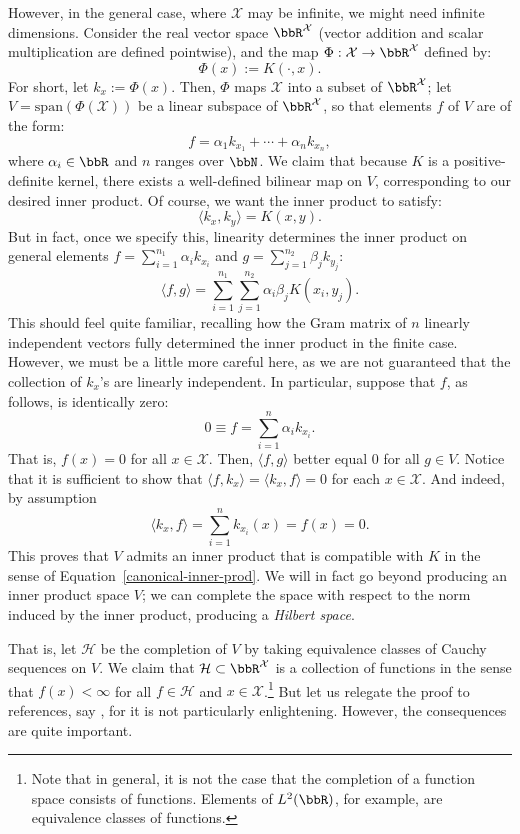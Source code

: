 \documentclass[twoside,11pt]{homework}
\begin{document}
However, in the general case, where $\mathcal{X}$ may be infinite, we might need infinite dimensions. Consider the real vector space $\bbR^\mathcal{X}$ (vector addition and scalar multiplication are defined pointwise), and the map $\Phi: \mathcal{X} \to \bbR^\mathcal{X}$ defined by:
\[\Phi(x) :=K(\cdot, x).\]
For short, let $k_x := \Phi(x)$. Then, $\Phi$ maps $\mathcal{X}$ into a subset of $\bbR^\mathcal{X}$; let $V = \mathrm{span}(\Phi(\mathcal{X}))$ be a linear subspace of $\bbR^\mathcal{X}$, so that elements $f$ of $V$ are of the form:
\[f= \alpha_1k_{x_1} + \dotsm + \alpha_n k_{x_n},\]
where $\alpha_i \in \bbR$ and $n$ ranges over $\bbN$. We claim that because $K$ is a positive-definite kernel, there exists a well-defined bilinear map on $V$, corresponding to our desired inner product. Of course, we want the inner product to satisfy:
\[\langle k_x, k_y\rangle = K(x,y).\]
But in fact, once we specify this, linearity determines the inner product on general elements $f = \sum_{i=1}^{n_1} \alpha_i k_{x_i}$ and $g = \sum_{j=1}^{n_2} \beta_j k_{y_j}$:
\[\langle f, g \rangle = \sum_{i=1}^{n_1} \sum_{j=1}^{n_2} \alpha_i \beta_j K(x_i, y_j).\]
This should feel quite familiar, recalling how the Gram matrix of $n$ linearly independent vectors fully determined the inner product in the finite case. However, we must be a little more careful here, as we are not guaranteed that the collection of $k_x$'s are linearly independent. In particular, suppose that $f$, as follows, is identically zero:
\[0 \equiv f = \sum_{i=1}^n \alpha_i k_{x_i}.\]
That is, $f(x) = 0$ for all $x \in \mathcal{X}$. Then, $\langle f, g\rangle$ better equal 0 for all $g \in V$. Notice that it is sufficient to show that $\langle f, k_x\rangle = \langle k_x , f\rangle = 0$ for each $x \in \mathcal{X}$. And indeed, by assumption
\[\langle k_x, f\rangle = \sum_{i=1}^n k_{x_i}(x) = f(x) = 0.\]
This proves that $V$ admits an inner product that is compatible with $K$ in the sense of Equation~\ref{canonical-inner-prod}. We will in fact go beyond producing an inner product space $V$; we can complete the space with respect to the norm induced by the inner product, producing a \emph{Hilbert space}.

That is, let $\mathcal{H}$ be the completion of $V$ by taking equivalence classes of Cauchy sequences on $V$. We claim that $\mathcal{H} \subset \bbR^\mathcal{X}$ is a collection of functions in the sense that $f(x) < \infty$ for all $f \in \mathcal{H}$ and $x \in \mathcal{X}$.\footnote{Note that in general, it is not the case that the completion of a function space consists of functions. Elements of $L^2(\bbR)$, for example, are equivalence classes of functions.} But let us relegate the proof to references, say \cite[Thm 3.16]{P2009}, for it is not particularly enlightening. However, the consequences are quite important.
\end{document}

